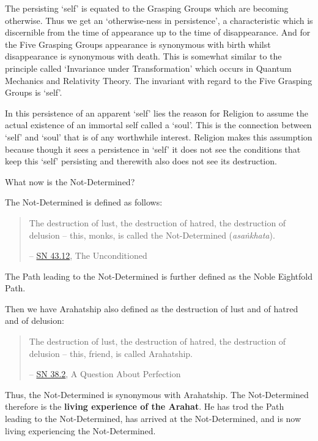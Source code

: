 The persisting `self' is equated to the Grasping Groups which are becoming otherwise. Thus we get an `otherwise-ness in persistence', a characteristic which is discernible from the time of appearance up to the time of disappearance. And for the Five Grasping Groups appearance is synonymous with birth whilst disappearance is synonymous with death. This is somewhat similar to the principle called `Invariance under Transformation' which occurs in Quantum Mechanics and Relativity Theory. The invariant with regard to the Five Grasping Groups is `self'.

In this persistence of an apparent `self' lies the reason for Religion to assume the actual existence of an immortal self called a `soul'. This is the connection between `self' and `soul' that is of any worthwhile interest. Religion makes this assumption because though it sees a persistence in `self' it does not see the conditions that keep this `self' persisting and therewith also does not see its destruction.

What now is the Not-Determined?

The Not-Determined is defined as follows:

\begin{quote}
The destruction of lust, the destruction of hatred, the destruction of delusion -- this, monks, is called the Not-Determined (\emph{asaṅkhata}).

 -- \href{https://suttacentral.net/sn43.12/en/bodhi}{SN 43.12}, The Unconditioned
\end{quote}

The Path leading to the Not-Determined is further defined as the Noble Eightfold Path.

Then we have Arahatship also defined as the destruction of lust and of hatred and of delusion:

\begin{quote}
The destruction of lust, the destruction of hatred, the destruction of delusion -- this, friend, is called Arahatship.

 -- \href{https://suttacentral.net/sn38.2/en/sujato}{SN 38.2}, A Question About Perfection
\end{quote}

\protect\hypertarget{living-experience}{}{}Thus, the Not-Determined is synonymous with Arahatship. The Not-Determined therefore is the \textbf{living experience of the Arahat}. He has trod the Path leading to the Not-Determined, has arrived at the Not-Determined, and is now living experiencing the Not-Determined.

